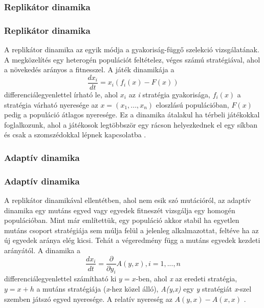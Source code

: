 \subsubsection{Replikátor dinamika}
\begin{frame}
\frametitle{Replikátor dinamika}
A replikátor dinamika az egyik módja a gyakoriság-függő szelekció vizsgálatának. A megközelítés egy heterogén populációt feltételez, véges számú stratégiával, ahol a növekedés arányos a fitnesszel. A játék dinamikája a 
\begin{equation}
\frac{dx_i}{dt} = x_i(f_i(x) - F(x))
\end{equation}
differenciálegyenlettel írható le, ahol \(x_i\) az \textit{i} stratégia gyakorisága, \(f_i(x)\) a stratégia várható nyeresége az \(x = (x_1,...,x_n)\) eloszlású populációban, \(F(x)\) pedig a populáció átlagos nyeresége.
Ez a dinamika átalakul ha térbeli játékokkal foglalkozunk, ahol a játékosok legtöbbször egy rácson helyezkednek el egy síkban és csak a szomszédokkal lépnek kapcsolatba \cite{hummert2014evolutionary}. 
\end{frame}

\subsubsection{Adaptív dinamika}
\begin{frame}
\frametitle{Adaptív dinamika}
A replikátor dinamikával ellentétben, ahol nem esik szó mutációról, az adaptív dinamika egy mutáns egyed vagy egyedek fitneszét vizsgálja egy homogén populációban. Mint már említettük, egy populáció akkor stabil ha egyetlen mutáns csoport stratégiája sem múlja felül a jelenleg alkalmazottat, feltéve ha az új egyedek aránya elég kicsi. Tehát a végeredmény függ a mutáns egyedek  kezdeti arányától. A dinamika a 
\begin{equation}
\frac{dx_i}{dt} = \frac{\partial}{\partial y_i}A(y,x), i = 1,...,n
\end{equation}
differenciálegyenlettel számítható ki \(y = x\)-ben, ahol \textit{x} az eredeti stratégia, \(y = x + h\) a mutáns stratégiája (\textit{x}-hez közel álló), \textit{A(y,x)} egy \textit{y} stratégiát \textit{x}-szel szemben játszó egyed nyeresége. A relatív nyereség az \(A(y,x) - A(x,x)\) \cite{hummert2014evolutionary}.
\end{frame}